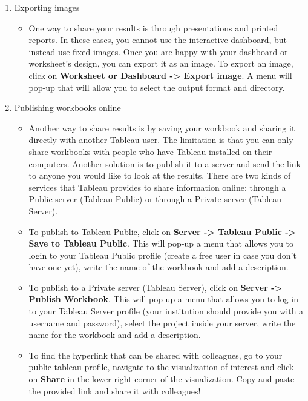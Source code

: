 \documentclass[
]{book}
\providecommand{\tightlist}{%
  \setlength{\itemsep}{0pt}\setlength{\parskip}{0pt}}
\begin{document}
\begin{enumerate}
\def\labelenumi{\arabic{enumi}.}
\tightlist
\item
  Exporting images

  \begin{itemize}
  \tightlist
  \item
    One way to share your results is through presentations and printed reports. In these cases, you cannot use the interactive dashboard, but instead use fixed images. Once you are happy with your dashboard or worksheet's design, you can export it as an image. To export an image, click on \textbf{Worksheet or Dashboard -\textgreater{} Export image}. A menu will pop-up that will allow you to select the output format and directory.
  \end{itemize}
\item
  Publishing workbooks online

  \begin{itemize}
  \tightlist
  \item
    Another way to share results is by saving your workbook and sharing it directly with another Tableau user. The limitation is that you can only share workbooks with people who have Tableau installed on their computers. Another solution is to publish it to a server and send the link to anyone you would like to look at the results. There are two kinds of services that Tableau provides to share information online: through a Public server (Tableau Public) or through a Private server (Tableau Server).
  \item
    To publish to Tableau Public, click on \textbf{Server -\textgreater{} Tableau Public -\textgreater{} Save to Tableau Public}. This will pop-up a menu that allows you to login to your Tableau Public profile (create a free user in case you don't have one yet), write the name of the workbook and add a description.
  \item
    To publish to a Private server (Tableau Server), click on \textbf{Server -\textgreater{} Publish Workbook}. This will pop-up a menu that allows you to log in to your Tableau Server profile (your institution should provide you with a username and password), select the project inside your server, write the name for the workbook and add a description.
  \item
    To find the hyperlink that can be shared with colleagues, go to your public tableau profile, navigate to the visualization of interest and click on \textbf{Share} in the lower right corner of the visualization. Copy and paste the provided link and share it with colleagues!
  \end{itemize}
\end{enumerate}
\end{document}
